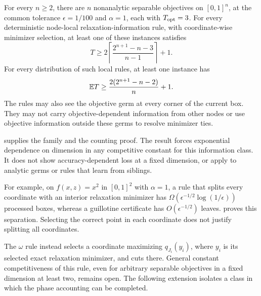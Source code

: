 \begin{proposition}
\label{branching:dimension-obstruction}
For every $n\ge2$, there are $n$ nonanalytic separable objectives on
$[0,1]^n$, at the common tolerance $\epsilon=1/100$ and $\alpha=1$,
each with $T_{\rm opt}=3$. For every deterministic node-local
relaxation-information rule, with coordinate-wise minimizer selection,
at least one of these instances satisfies
\[
 T\ge2\left\lceil\frac{2^{n+1}-n-3}{n-1}\right\rceil+1.
\]
For every distribution of such local rules, at least one instance has
\[
 \mathbb{E} T\ge\frac{2(2^{n+1}-n-2)}n+1.
\]
The rules may also see the objective germ at every corner of the current
box. They may not carry objective-dependent information from other nodes
or use objective information outside these germs to resolve minimizer ties.
\end{proposition}

 supplies the family and the counting proof.
The result forces exponential dependence on dimension in any competitive
constant for this information class. It does not show accuracy-dependent
loss at a fixed dimension, or apply to analytic germs or rules that learn
from siblings.

For example, on $f(x,z)=x^2$ in $[0,1]^2$ with $\alpha=1$, a rule that
splits every coordinate with an interior relaxation minimizer has
$\Omega(\epsilon^{-1/2}\log(1/\epsilon))$ processed boxes, whereas a
guillotine certificate has $O(\epsilon^{-1/2})$ leaves.
 proves this separation. Selecting the correct
point in each coordinate does not justify splitting all coordinates.

The $\omega$ rule instead selects a coordinate maximizing
$q_{J_i}(y_i)$, where $y_i$ is its selected exact relaxation minimizer,
and cuts there. General constant competitiveness of this rule, even
for arbitrary separable objectives in a fixed dimension at least two,
remains open. The following extension isolates a class in which the
phase accounting can be completed.

